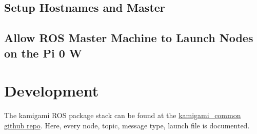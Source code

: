 \documentclass[11pt]{article}
\begin{document}
\subsection{Setup Hostnames and Master}

\subsection{Allow ROS Master Machine to Launch Nodes on the Pi 0 W}

\section{Development}

The kamigami ROS package stack can be found at the \href{https://github.com/BML-MultiRobot/kamigami_common}{kamigami\_common github repo}. Here, every node, topic, message type, launch file is documented.
\end{document}
